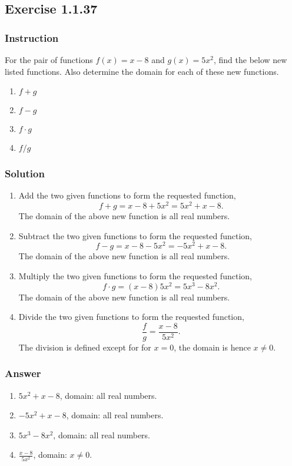 \subsection*{Exercise 1.1.37}

\subsubsection*{Instruction}

For the pair of functions $ f(x) = x - 8 $ and $ g(x) = 5x^2 $, find the below new listed functions. Also determine the domain for each of these new functions.

\begin{enumerate}[label = (\alph*)]
  \item $ f + g $
  \item $ f - g $
  \item $ f \cdot g $
  \item $ f / g $
\end{enumerate}

\subsubsection*{Solution}

\begin{enumerate}[label = (\alph*)]
  \item
    Add the two given functions to form the requested function,
    $$ \phantom{.}
    f + g = x - 8 + 5x^2 = 5x^2 + x - 8
    .$$
    The domain of the above new function is all real numbers.
  \item
    Subtract the two given functions to form the requested function,
    $$ \phantom{.}
    f - g = x - 8 - 5x^2 = -5x^2 + x - 8
    .$$
    The domain of the above new function is all real numbers.
  \item
    Multiply the two given functions to form the requested function,
    $$ \phantom{.}
    f \cdot g = (x - 8)5x^2 = 5x^3 - 8x^2
    .$$
    The domain of the above new function is all real numbers.
  \item
    Divide the two given functions to form the requested function,
    $$ \phantom{.}
    \frac{f}{g} = \frac{x - 8}{5x^2}
    .$$
    The division is defined except for for $ x = 0 $, the domain is hence $ x \neq 0 $.

\end{enumerate}

\subsubsection*{Answer}

\begin{enumerate}[label = (\alph*)]
  \item
    $ 5x^2 + x - 8 $, domain: all real numbers.
  \item
    $ -5x^2 + x - 8 $, domain: all real numbers.
  \item
    $ 5x^3 - 8x^2 $, domain: all real numbers.
  \item
    $ \frac{x - 8}{5x^2} $, domain: $ x \neq 0 $.
\end{enumerate}

